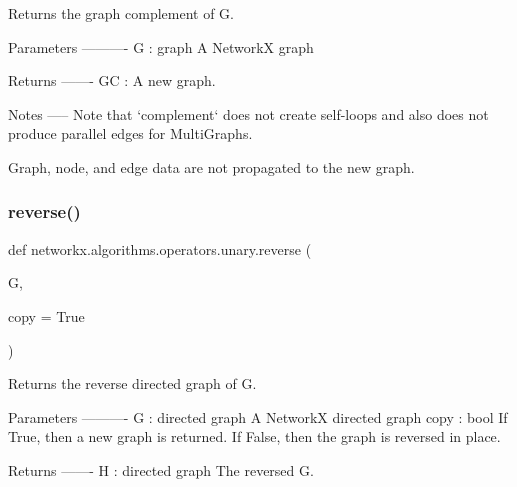 \begin{DoxyVerb}Returns the graph complement of G.

Parameters
----------
G : graph
   A NetworkX graph

Returns
-------
GC : A new graph.

Notes
-----
Note that `complement` does not create self-loops and also
does not produce parallel edges for MultiGraphs.

Graph, node, and edge data are not propagated to the new graph.
\end{DoxyVerb}
 \mbox{\label{namespacenetworkx_1_1algorithms_1_1operators_1_1unary_a7a3d5849f1adccb2d9443d4040ce1b3d}} 
\subsubsection{\texorpdfstring{reverse()}{reverse()}}
{\footnotesize\ttfamily def networkx.\+algorithms.\+operators.\+unary.\+reverse (\begin{DoxyParamCaption}\item[{}]{G,  }\item[{}]{copy = {\ttfamily True} }\end{DoxyParamCaption})}

\begin{DoxyVerb}Returns the reverse directed graph of G.

Parameters
----------
G : directed graph
    A NetworkX directed graph
copy : bool
    If True, then a new graph is returned. If False, then the graph is
    reversed in place.

Returns
-------
H : directed graph
    The reversed G.\end{DoxyVerb}
 